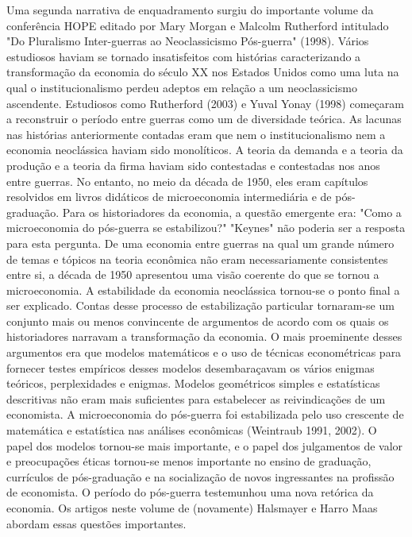 \documentclass[12pt]{article}
\begin{document}
Uma segunda narrativa de enquadramento surgiu do importante volume da conferência HOPE editado por Mary Morgan e Malcolm Rutherford intitulado "Do Pluralismo Inter-guerras ao Neoclassicismo Pós-guerra" (1998). Vários estudiosos haviam se tornado insatisfeitos com histórias caracterizando a transformação da economia do século XX nos Estados Unidos como uma luta na qual o institucionalismo perdeu adeptos em relação a um neoclassicismo ascendente. Estudiosos como Rutherford (2003) e Yuval Yonay (1998) começaram a reconstruir o período entre guerras como um de diversidade teórica. As lacunas nas histórias anteriormente contadas eram que nem o institucionalismo nem a economia neoclássica haviam sido monolíticos. A teoria da demanda e a teoria da produção e a teoria da firma haviam sido contestadas e contestadas nos anos entre guerras. No entanto, no meio da década de 1950, eles eram capítulos resolvidos em livros didáticos de microeconomia intermediária e de pós-graduação. Para os historiadores da economia, a questão emergente era: "Como a microeconomia do pós-guerra se estabilizou?" "Keynes" não poderia ser a resposta para esta pergunta. De uma economia entre guerras na qual um grande número de temas e tópicos na teoria econômica não eram necessariamente consistentes entre si, a década de 1950 apresentou uma visão coerente do que se tornou a microeconomia. A estabilidade da economia neoclássica tornou-se o ponto final a ser explicado. Contas desse processo de estabilização particular tornaram-se um conjunto mais ou menos convincente de argumentos de acordo com os quais os historiadores narravam a transformação da economia. O mais proeminente desses argumentos era que modelos matemáticos e o uso de técnicas econométricas para fornecer testes empíricos desses modelos desembaraçavam os vários enigmas teóricos, perplexidades e enigmas. Modelos geométricos simples e estatísticas descritivas não eram mais suficientes para estabelecer as reivindicações de um economista. A microeconomia do pós-guerra foi estabilizada pelo uso crescente de matemática e estatística nas análises econômicas (Weintraub 1991, 2002). O papel dos modelos tornou-se mais importante, e o papel dos julgamentos de valor e preocupações éticas tornou-se menos importante no ensino de graduação, currículos de pós-graduação e na socialização de novos ingressantes na profissão de economista. O período do pós-guerra testemunhou uma nova retórica da economia. Os artigos neste volume de (novamente) Halsmayer e Harro Maas abordam essas questões importantes.
\end{document}
